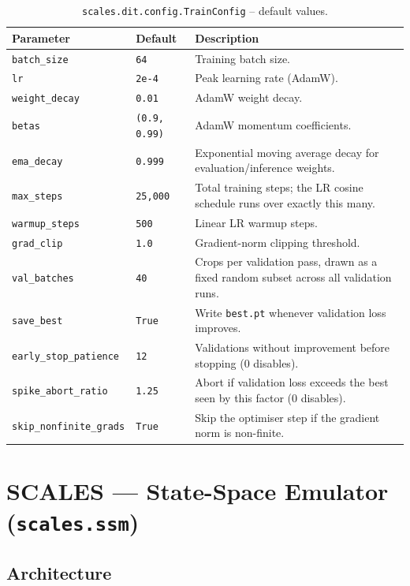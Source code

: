 \documentclass[11pt]{article}
\begin{document}
\begin{table}[h]
\centering
\caption{\texttt{scales.dit.config.TrainConfig} -- default values.}
\begin{tabular}{@{}llL{7cm}@{}}
\toprule
Parameter & Default & Description \\
\midrule
\texttt{batch\_size}          & \texttt{64}     & Training batch size. \\
\texttt{lr}                   & \texttt{2e-4}   & Peak learning rate (AdamW). \\
\texttt{weight\_decay}        & \texttt{0.01}   & AdamW weight decay. \\
\texttt{betas}                & \texttt{(0.9, 0.99)} & AdamW momentum coefficients. \\
\texttt{ema\_decay}           & \texttt{0.999}  & Exponential moving average decay for evaluation/inference weights. \\
\texttt{max\_steps}           & \texttt{25{,}000} & Total training steps; the LR cosine schedule runs over exactly this many. \\
\texttt{warmup\_steps}        & \texttt{500}    & Linear LR warmup steps. \\
\texttt{grad\_clip}           & \texttt{1.0}    & Gradient-norm clipping threshold. \\
\texttt{val\_batches}         & \texttt{40}     & Crops per validation pass, drawn as a fixed random subset across all validation runs. \\
\texttt{save\_best}           & \texttt{True}   & Write \texttt{best.pt} whenever validation loss improves. \\
\texttt{early\_stop\_patience} & \texttt{12}    & Validations without improvement before stopping (0 disables). \\
\texttt{spike\_abort\_ratio}  & \texttt{1.25}   & Abort if validation loss exceeds the best seen by this factor (0 disables). \\
\texttt{skip\_nonfinite\_grads} & \texttt{True} & Skip the optimiser step if the gradient norm is non-finite. \\
\bottomrule
\end{tabular}
\end{table}

\clearpage
\section{SCALES --- State-Space Emulator (\texttt{scales.ssm})}

\subsection{Architecture}
\end{document}
